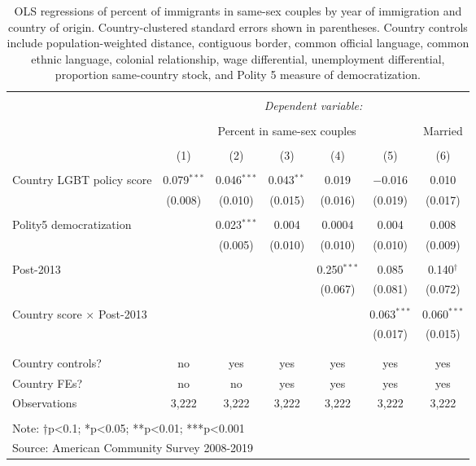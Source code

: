 \documentclass[
  11pt,
]{article}
\begin{document}
\begin{table}[!htbp] \centering 
  \caption{OLS regressions of percent of immigrants in same-sex couples by year of immigration and country of origin. Country-clustered standard errors shown in parentheses. Country controls include population-weighted distance, contiguous border, common official language, common ethnic language, colonial relationship, wage differential, unemployment differential, proportion same-country stock, and Polity 5 measure of democratization.} 
  \label{tab:country-props} 
\begin{tabular}{@{\extracolsep{5pt}}lcccccc} 
\\[-1.8ex]\hline 
\hline \\[-1.8ex] 
 & \multicolumn{6}{c}{\textit{Dependent variable:}} \\ 
\cline{2-7} 
\\[-1.8ex] & \multicolumn{5}{c}{Percent in same-sex couples} & Married \\ 
\\[-1.8ex] & (1) & (2) & (3) & (4) & (5) & (6)\\ 
\hline \\[-1.8ex] 
 Country LGBT policy score & 0.079$^{***}$ & 0.046$^{***}$ & 0.043$^{**}$ & 0.019 & $-$0.016 & 0.010 \\ 
  & (0.008) & (0.010) & (0.015) & (0.016) & (0.019) & (0.017) \\ 
  & & & & & & \\ 
 Polity5 democratization &  & 0.023$^{***}$ & 0.004 & 0.0004 & 0.004 & 0.008 \\ 
  &  & (0.005) & (0.010) & (0.010) & (0.010) & (0.009) \\ 
  & & & & & & \\ 
 Post-2013 &  &  &  & 0.250$^{***}$ & 0.085 & 0.140$^{†}$ \\ 
  &  &  &  & (0.067) & (0.081) & (0.072) \\ 
  & & & & & & \\ 
 Country score × Post-2013 &  &  &  &  & 0.063$^{***}$ & 0.060$^{***}$ \\ 
  &  &  &  &  & (0.017) & (0.015) \\ 
  & & & & & & \\ 
\hline \\[-1.8ex] 
Country controls? & no & yes & yes & yes & yes & yes \\ 
Country FEs? & no & no & yes & yes & yes & yes \\ 
Observations & 3,222 & 3,222 & 3,222 & 3,222 & 3,222 & 3,222 \\ 
\hline 
\hline \\[-1.8ex] 
\multicolumn{7}{l}{Note: †p<0.1; *p<0.05; **p<0.01; ***p<0.001} \\ 
\multicolumn{7}{l}{Source: American Community Survey 2008-2019} \\ 
\end{tabular} 
\end{table}
\end{document}
